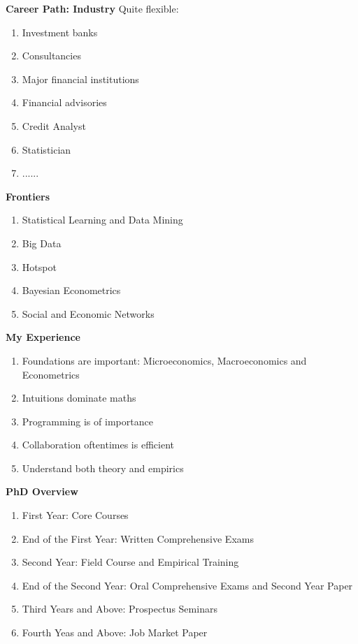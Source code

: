 \documentclass{beamer}
\let\olditem=\item%
\renewcommand{\item}{\olditem \justifying}%
\begin{document}
\begin{frame}{\bf Career Path: Industry}
Quite flexible:
~\\
\begin{enumerate}
	\item Investment banks
	\item Consultancies
\item Major financial institutions
\item 	Financial advisories
\item Credit Analyst
\item Statistician
\item ......
\end{enumerate}
\end{frame}

\begin{frame}{\bf Frontiers}
\begin{enumerate}
	\item Statistical Learning and Data Mining
	\item Big Data
	\item Hotspot
   	\item Bayesian Econometrics
   	\item Social and Economic Networks
\end{enumerate}
\end{frame}

\begin{frame}{\bf My Experience}
\begin{enumerate}
	\item Foundations are important: Microeconomics, Macroeconomics and Econometrics
	\item Intuitions dominate maths
	\item Programming is of importance
	\item Collaboration oftentimes is efficient
	\item Understand both theory and empirics
\end{enumerate}
\end{frame}

\begin{frame}{\bf PhD Overview}
\begin{enumerate}
	\item First Year: Core Courses
	\item End of the First Year: Written Comprehensive Exams
	\item Second Year: Field Course and Empirical Training
	\item End of the Second Year: Oral Comprehensive Exams and Second Year Paper
	\item Third Years and Above: Prospectus Seminars
	\item Fourth Yeas and Above: Job Market Paper
\end{enumerate}
\end{frame}
\end{document}
